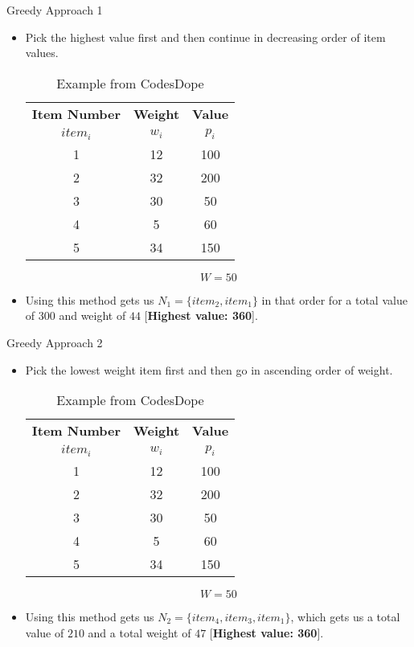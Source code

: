 \documentclass{beamer}
\begin{document}
	\begin{frame}{Greedy Approach 1}
		\begin{itemize}
			\item Pick the highest value first and then continue in decreasing order of item values.
				\begin{table}[h!]
					\begin{center}
						\caption{Example from CodesDope \cite{noauthor_knapsack_nodate-2}}
						\label{tab:example1}
						\begin{tabular}{c|c|c}
							\toprule %
							\textbf{Item Number} & \textbf{Weight} & \textbf{Value}\\
							$item_i$ & $w_i$ & $p_i$ \\
							\midrule %
							1 & 12 & 100 \\
							2 & 32 & 200 \\
							3 & 30 & 50 \\
							4 & 5 & 60 \\
							5 & 34 & 150
						\end{tabular}
					\end{center} \vspace{12pt}
				$$
				W = 50
				$$
			\end{table}
			\item Using this method gets us $N_1 = \{item_2, item_1\}$ in that order for a total value of $300$ and weight of $44$ [\textbf{Highest value: 360}].
		\end{itemize}
	\end{frame}
	
	\begin{frame}{Greedy Approach 2}
		\begin{itemize}
			\item Pick the lowest weight item first and then go in ascending order of weight.
				\begin{table}[h!]
				\begin{center}
					\caption{Example from CodesDope \cite{noauthor_knapsack_nodate-2}}
					\label{tab:example1.5}
					\begin{tabular}{c|c|c}
						\toprule %
						\textbf{Item Number} & \textbf{Weight} & \textbf{Value}\\
						$item_i$ & $w_i$ & $p_i$ \\
						\midrule %
						1 & 12 & 100 \\
						2 & 32 & 200 \\
						3 & 30 & 50 \\
						4 & 5 & 60 \\
						5 & 34 & 150
					\end{tabular}
				\end{center} \vspace{12pt}
				$$
				W = 50
				$$
				\end{table}
			\item Using this method gets us $N_2 = \{item_4, item_3, item_1\}$, which gets us a total value of $210$ and a total weight of $47$ [\textbf{Highest value: 360}].
		\end{itemize}	
	\end{frame}
	
\end{document}
